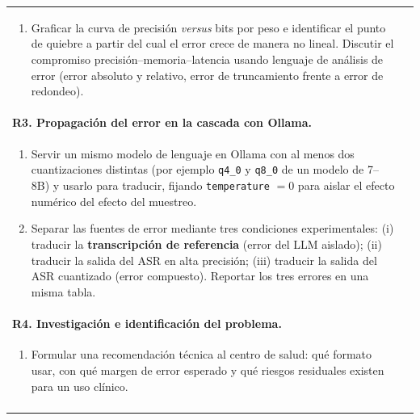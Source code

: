 \documentclass[12pt]{article}
\begin{document}
\begin{longtable}{|p{\textwidth}|@{}c@{}}
\begin{enumerate}[label=\alph*)]
  \item Graficar la curva de precisión \textit{versus} bits por peso e identificar el punto de quiebre a
  partir del cual el error crece de manera no lineal. Discutir el compromiso
  precisión--memoria--latencia usando lenguaje de análisis de error (error absoluto y relativo, error
  de truncamiento frente a error de redondeo).
  \end{enumerate}&\\
  \textbf{R3. Propagación del error en la cascada con Ollama.}&\\
  \begin{enumerate}[label=\alph*)]\setlength\itemsep{0pt}
  \item Servir un mismo modelo de lenguaje en Ollama con al menos dos cuantizaciones distintas
  (por ejemplo \texttt{q4\_0} y \texttt{q8\_0} de un modelo de 7--8B) y usarlo para traducir, fijando
  \texttt{temperature} $=0$ para aislar el efecto numérico del efecto del muestreo.
  \item Separar las fuentes de error mediante tres condiciones experimentales:
  (i) traducir la \textbf{transcripción de referencia} (error del LLM aislado);
  (ii) traducir la salida del ASR en alta precisión; (iii) traducir la salida del ASR cuantizado
  (error compuesto). Reportar los tres errores en una misma tabla.
  \end{enumerate}&\\
  \textbf{R4. Investigación e identificación del problema.}&\\
  \begin{enumerate}[label=\alph*)]\setlength\itemsep{0pt}
  \item Formular una recomendación técnica al centro de salud: qué formato usar, con qué margen de
  error esperado y qué riesgos residuales existen para un uso clínico.
  \end{enumerate}&\\&\\\hline
\end{longtable}
\end{document}
